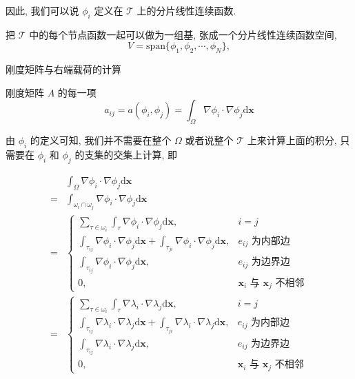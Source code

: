 \documentclass{article}
\begin{document}
因此, 我们可以说 $\phi_i$ 定义在 $\mathcal T$ 上的分片线性连续函数.

把 $\mathcal T$ 中的每个节点函数一起可以做为一组基, 张成一个分片线性连续函数空间,
$$
V = \text{span}\{\phi_1, \phi_2, \cdots, \phi_N\},
$$

{\large 刚度矩阵与右端载荷的计算}

刚度矩阵 $A$ 的每一项
$$
a_{ij} = a(\phi_i, \phi_j) = \int_{\Omega}\nabla \phi_i\cdot\nabla \phi_j\mathrm d\mathbf x
$$

由 $\phi_i$ 的定义可知, 我们并不需要在整个 $\Omega$ 或者说整个 $\mathcal T$ 上来计算上面的积分, 只需要在 $\phi_i$ 和 $\phi_j$ 的支集的交集上计算, 即

$$
\begin{aligned}
&\int_{\Omega}\nabla \phi_i\cdot\nabla \phi_j\mathrm d\mathbf x\\
= &\int_{\omega_i\cap\omega_j}\nabla \phi_i\cdot\nabla \phi_j\mathrm d\mathbf x\\
= & 
\begin{cases}
\sum_{\tau\in\omega_i}\int_{\tau}\nabla \phi_i\cdot\nabla \phi_j\mathrm d\mathbf x, & i=j \\
\int_{\tau_{ij}}\nabla \phi_i\cdot\nabla \phi_j\mathrm d\mathbf x + \int_{\tau_{ji}}\nabla \phi_i\cdot\nabla \phi_j\mathrm d\mathbf x, & e_{ij}\text{ 为内部边} \\
\int_{\tau_{ij}}\nabla \phi_i\cdot\nabla \phi_j\mathrm d\mathbf x, & e_{ij}\text{ 为边界边} \\
0, & \mathbf x_i \text{ 与 } \mathbf x_j\text{ 不相邻}
\end{cases}\\
= & 
\begin{cases}
\sum_{\tau\in\omega_i}\int_{\tau}\nabla \lambda_i\cdot\nabla \lambda_j\mathrm d\mathbf x, & i=j \\
\int_{\tau_{ij}}\nabla \lambda_i\cdot\nabla \lambda_j\mathrm d\mathbf x + \int_{\tau_{ji}}\nabla \lambda_i\cdot\nabla \lambda_j\mathrm d\mathbf x, & e_{ij}\text{ 为内部边} \\
\int_{\tau_{ij}}\nabla \lambda_i\cdot\nabla \lambda_j\mathrm d\mathbf x, & e_{ij}\text{ 为边界边} \\
0, & \mathbf x_i \text{ 与 } \mathbf x_j\text{ 不相邻}
\end{cases}\\
\end{aligned}
$$
\end{document}
